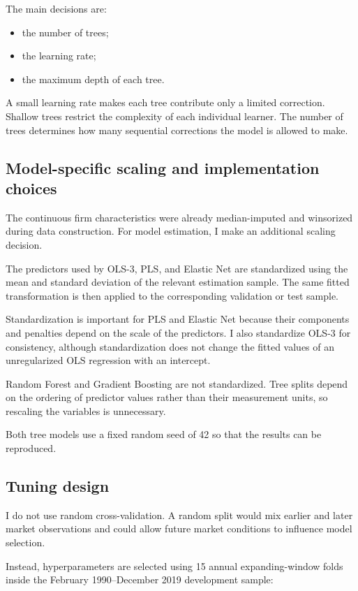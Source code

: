 \documentclass[11pt,a4paper]{article}
\begin{document}
The main decisions are:

\begin{itemize}
  \item the number of trees;
  \item the learning rate;
  \item the maximum depth of each tree.
\end{itemize}

A small learning rate makes each tree contribute only a limited correction.
Shallow trees restrict the complexity of each individual learner. The number of
trees determines how many sequential corrections the model is allowed to make.

\subsection{Model-specific scaling and implementation choices}

The continuous firm characteristics were already median-imputed and winsorized
during data construction. For model estimation, I make an additional scaling
decision.

The predictors used by OLS-3, PLS, and Elastic Net are standardized using the
mean and standard deviation of the relevant estimation sample. The same fitted
transformation is then applied to the corresponding validation or test sample.

Standardization is important for PLS and Elastic Net because their components
and penalties depend on the scale of the predictors. I also standardize OLS-3
for consistency, although standardization does not change the fitted values of
an unregularized OLS regression with an intercept.

Random Forest and Gradient Boosting are not standardized. Tree splits depend on
the ordering of predictor values rather than their measurement units, so
rescaling the variables is unnecessary.

Both tree models use a fixed random seed of 42 so that the results can be
reproduced.

\subsection{Tuning design}

I do not use random cross-validation. A random split would mix earlier and
later market observations and could allow future market conditions to influence
model selection.

Instead, hyperparameters are selected using 15 annual expanding-window folds
inside the February 1990--December 2019 development sample:
\end{document}
